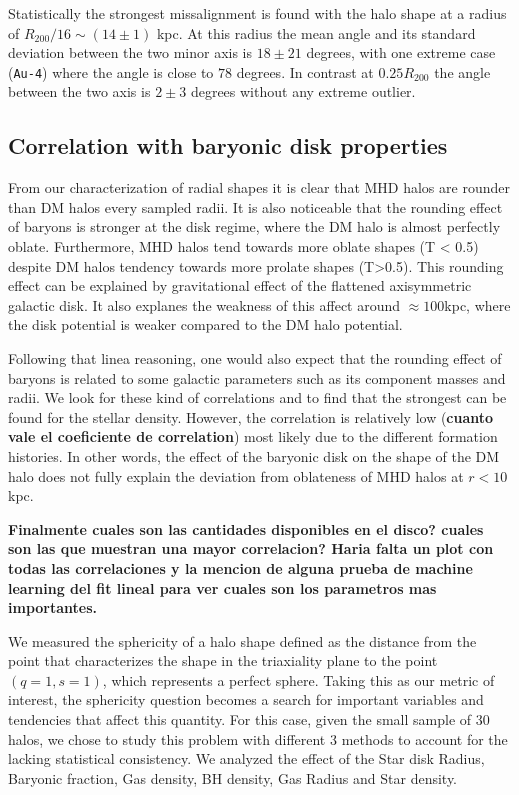 \documentclass[a4paper,fleqn,usenatbib]{mnras}
\begin{document}
Statistically the strongest missalignment is found with the halo shape
at a radius of $R_{200}/16\sim (14\pm1)$ kpc. 
At this radius the mean angle and its standard deviation between the
two minor axis is $18 \pm 21$ degrees, with one extreme case
(\texttt{Au-4}) where the angle is close to $78$ degrees. 
In contrast at $0.25 R_{200}$ the angle between the two axis is
$2\pm 3$ degrees without any extreme outlier.



\subsection{Correlation with baryonic disk properties}

From our characterization of radial shapes it is clear that
MHD halos are rounder than DM halos every sampled radii. 
It is also noticeable that the rounding effect of baryons is stronger
at the disk regime, where the DM halo is almost perfectly oblate. 
Furthermore, MHD halos tend towards more oblate shapes (T < 0.5)
despite DM halos tendency towards more prolate shapes (T>0.5). 
This rounding effect can be explained by gravitational effect of the
flattened axisymmetric galactic disk. 
It also explanes the weakness of this affect around $\approx 100$kpc,
where the disk potential is weaker compared to the DM halo potential. 

Following that linea reasoning, one would also expect that the rounding
effect of baryons is related to some  galactic parameters such as its
component masses and radii. 
We look for these kind of correlations and to find that the strongest
can be found for the stellar density.
However, the correlation is relatively low ({\bf cuanto vale el
  coeficiente de correlation}) most likely due to the different
formation histories.
In other words, the effect of the baryonic disk on the shape of the DM halo
does not fully explain the deviation from oblateness of MHD halos at
$r<10$kpc. 

{\bf Finalmente cuales son las cantidades disponibles en el disco?
  cuales son las que muestran una mayor correlacion? Haria falta un
  plot con todas las correlaciones y la mencion de alguna prueba de
  machine learning del fit lineal para ver cuales son los parametros
  mas importantes.}
  
  We measured the sphericity of a halo shape defined as the distance 
  from the point that characterizes the shape in the triaxiality plane
  to the point $(q=1,s=1)$, which represents a perfect sphere. Taking this 
  as our metric of interest, the sphericity question becomes a search for
  important variables and tendencies that affect this quantity. For this case,
  given the small sample of 30 halos, we chose to study this problem with different 
  3 methods to account for the lacking statistical consistency. We analyzed the effect
  of the Star disk Radius, Baryonic fraction, Gas density, BH density, Gas Radius and
  Star density.\\
   
\end{document}
